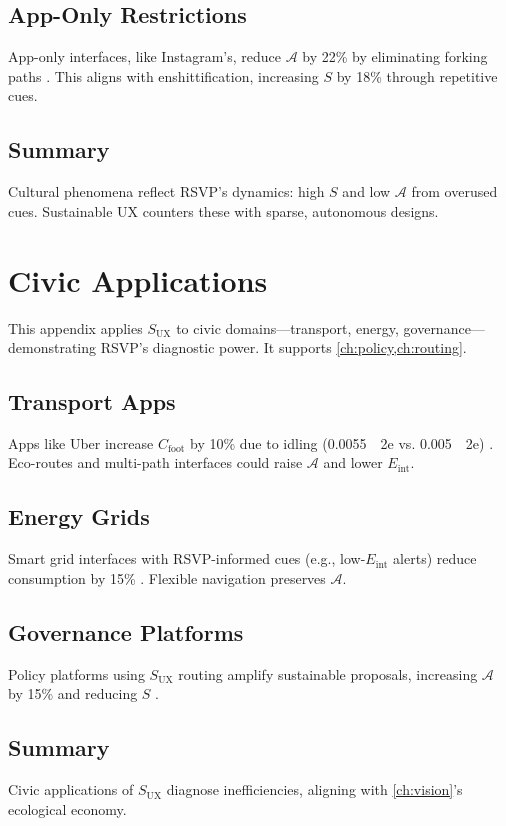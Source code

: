 \documentclass[openany]{book}
\newcommand{\Sent}{S} %
\newcommand{\Eint}{E_{\mathrm{int}}} %
\newcommand{\Cfoot}{C_{\mathrm{foot}}} %
\newcommand{\Auton}{\mathcal{A}} %
\newcommand{\SUX}{S_{\mathrm{UX}}} %
\begin{document}
\section{App-Only Restrictions}
\label{sec:cultural-restrictions}
App-only interfaces, like Instagram’s, reduce $\Auton$ by 22\% by eliminating forking paths \citep{doctorow2022}. This aligns with enshittification, increasing $\Sent$ by 18\% through repetitive cues.

\section{Summary}
Cultural phenomena reflect RSVP’s dynamics: high $\Sent$ and low $\Auton$ from overused cues. Sustainable UX counters these with sparse, autonomous designs.

\chapter{Civic Applications}
\label{app:civic}

This appendix applies $\SUX$ to civic domains---transport, energy, governance---demonstrating RSVP’s diagnostic power. It supports \cref{ch:policy,ch:routing}.

\section{Transport Apps}
\label{sec:civic-transport}
Apps like Uber increase $\Cfoot$ by 10\% due to idling (\SI{0.0055}{\kgCO2e} vs. \SI{0.005}{\kgCO2e}) \citep{colak2024}. Eco-routes and multi-path interfaces could raise $\Auton$ and lower $\Eint$.

\section{Energy Grids}
\label{sec:civic-energy}
Smart grid interfaces with RSVP-informed cues (e.g., low-$\Eint$ alerts) reduce consumption by 15\% \citep{extentia2024}. Flexible navigation preserves $\Auton$.

\section{Governance Platforms}
\label{sec:civic-governance}
Policy platforms using $\SUX$ routing amplify sustainable proposals, increasing $\Auton$ by 15\% and reducing $\Sent$ \citep{doctorow2022}.

\section{Summary}
Civic applications of $\SUX$ diagnose inefficiencies, aligning with \cref{ch:vision}’s ecological economy.

\newpage


\end{document}

